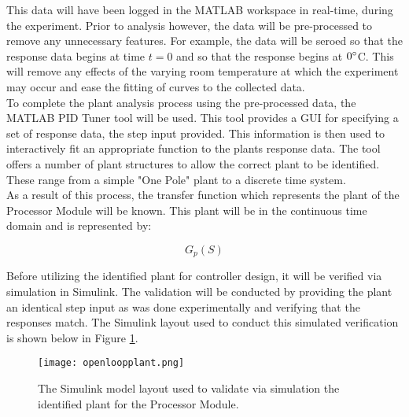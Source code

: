 This data will have been logged in the MATLAB workspace in real-time, during the experiment. Prior to analysis however, the data will be pre-processed to remove any unnecessary features. For example, the data will be seroed so that the response data begins at time $t = 0$ and so that the response begins at $0\degree$C. This will remove any effects of the varying room temperature at which the experiment may occur and ease the fitting of curves to the collected data.\\

To complete the plant analysis process using the pre-processed data, the MATLAB PID Tuner tool will be used. This tool provides a GUI for specifying a set of response data, the step input provided. This information is then used to interactively fit an appropriate function to the plants response data. The tool offers a number of plant structures to allow the correct plant to be identified. These range from a simple "One Pole" plant to a discrete time system.\\

As a result of this process, the transfer function which represents the plant of the Processor Module will be known. This plant will be in the continuous time domain and is represented by:

$$G_p(S)$$

Before utilizing the identified plant for controller design, it will be verified via simulation in Simulink. The validation will be conducted by providing the plant an identical step input as was done experimentally and verifying that the responses match. The Simulink layout used to conduct this simulated verification is shown below in Figure \ref{fig:openloopplant}.\\

\begin{figure}[!htb]
	\centering
	\texttt{[image: openloopplant.png]}
	\caption[Open loop plant valiation Simulink Model.]{The Simulink model layout used to validate via simulation the identified plant for the Processor Module.}
	\label{fig:openloopplant}
\end{figure} 
\FloatBarrier


